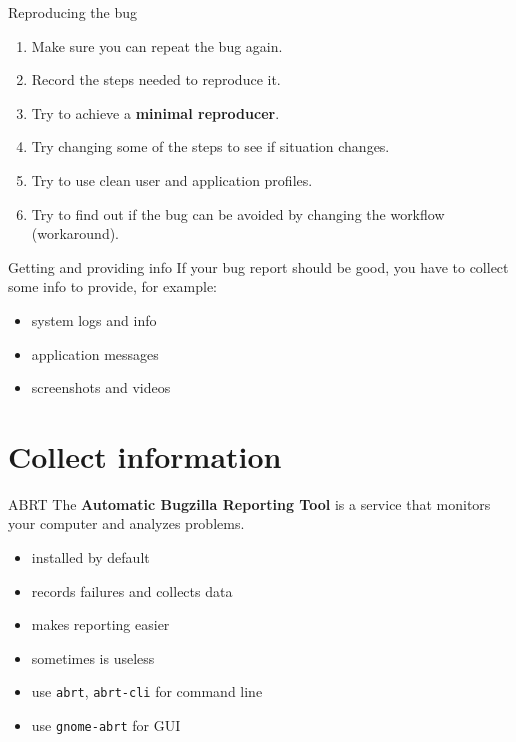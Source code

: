 \documentclass[12pt,aspectratio=169]{beamer}
\begin{document}
\begin{frame}{Reproducing the bug}
	\begin{enumerate}
		\item Make sure you can repeat the bug again.
		\item Record the steps needed to reproduce it.
		\item Try to achieve a \textbf{minimal reproducer}.
		\item Try changing some of the steps to see if situation changes.
		\item Try to use clean user and application profiles.
		\item Try to find out if the bug can be avoided by changing the workflow (workaround).
	\end{enumerate}
\end{frame}

\begin{frame}{Getting and providing info}
If your bug report should be good, you have to collect some info to provide, for example:
\begin{itemize}
	\item system logs and info
	\item application messages
	\item screenshots and videos
\end{itemize}
\end{frame}

\section{Collect information}
\begin{frame}{ABRT}
The \textbf{Automatic Bugzilla Reporting Tool} is a service that monitors your computer and analyzes problems.
\begin{itemize}
	\item installed by default
	\item records failures and collects data
	\item makes reporting easier
	\item sometimes is useless
	\item use {\color{blue}\texttt{abrt}}, {\color{blue} \texttt{abrt-cli}} for command line
	\item use {\color{blue} \texttt{gnome-abrt}} for GUI 
\end{itemize}
\end{frame}
\end{document}
